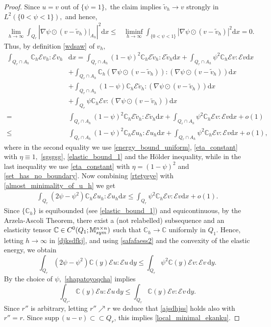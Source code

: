 \documentclass[reqno]{amsart}
\numberwithin{equation}{section}
\theoremstyle{plain}
\theoremstyle{definition}
\newcommand{\C}{\mathbb{C}}
\renewcommand{\d}{\mathrm{d}}
\newcommand{\strictlyincluded}{\subset\subset}
\renewcommand{\tilde}{\widetilde}
\newcommand{\supp}{\mathrm{supp}\,}
\newcommand{\str}[1]{\mathcal{E}#1}
\newcommand{\mtwo}{\mathbb{M}^{n\times n}_{\rm sym}}
\begin{document}
\begin{proof}
%
Since $u=v$ out of $\{\psi=1\},$ the claim implies 
$\tilde v_h\to v$  strongly in $L^2(\{0<\psi<1\}),$ and hence,
%
\begin{align}\label{sgsgsg}
\lim\limits_{h\to\infty} \int_{Q_r} |\nabla \psi\odot (v- \tilde v_h)\big|_{A_h}|^2 \d x \le & 
\liminf\limits_{h\to\infty}  \int_{\{0<\psi <1\}} |\nabla \psi\odot (v- \tilde v_h)|^2 \d x= 0. 
\end{align}
%
Thus, by definition \eqref{wdsaw} of $v_h,$
\begin{align}\label{rtetyeye}
\int_{Q_r\cap A_h}\C_h \str{v_h}:\str{v_h} & \d x =   \int_{Q_r\cap A_h} (1-\psi)^2\C_h \str{\tilde v_h}:\str{\tilde v_h}\d x
+ \int_{Q_r\cap A_h}\psi^2\C_h \str{v}:\str{v}\d x\nonumber \\
& + \int_{Q_r\cap A_h} \C_h (\nabla \psi\odot (v- \tilde v_h)) :( \nabla \psi\odot (v- \tilde v_h))\d x\nonumber \\
& + \int_{Q_r\cap A_h} (1-\psi) \C_h \str{\tilde v_h}:(\nabla \psi\odot (v- \tilde v_h))\d x\nonumber \\
& + 
\int_{Q_r} \psi \C_h\str{v}:
(\nabla \psi\odot (v- \tilde v_h))\d x\nonumber \\
=& \int_{Q_r\cap A_h} (1-\psi)^2\C_h \str{\tilde v_h}:\str{\tilde v_h}\d x
+ \int_{Q_r\cap A_h}\psi^2\C_h \str{v}:\str{v}\d x +
o(1)\nonumber\\
\le & 
\int_{Q_r\cap A_h} (1-\psi)^2\C_h \str{u_h}:\str{u_h}\d x 
+ \int_{Q_r\cap A_h}\psi^2\C_h \str{v}:\str{v}\d x + o(1), 
\end{align}
where in the second equality we use \eqref{energy_bound_uniform}, \eqref{eta_constant} with $\eta\equiv 1,$ \eqref{sgsgsg}, \eqref{elastic_bound_1} and   the H\"older inequality, while in the last inequality we use \eqref{eta_constant} with $\eta=(1-\psi)^2$  and \eqref{set_has_no_boundary}. 
% 
Now  combining \eqref{rtetyeye} with \eqref{almost_minimality_of_u_h}   we get
\begin{align}\label{djksdfkj}
\int_{Q_r}(2\psi -\psi^2)\C_h \str{u_h}:\str{u_h}\d x \le 
\int_{Q_r}\psi^2\C_h \str{v}:\str{v}\d x + o(1). 
\end{align}
%
Since $\{\C_h\}$ is equibounded (see \eqref{elastic_bound_1}) and equicontinuous,  by the Arzela-Ascoli Theorem, there exist  a (not relabelled) subsequence and an elasticity tensor $\C\in C^0(Q_1;\mtwo)$ such that  $\C_h\to \C$ uniformly in $Q_1.$ Hence, 
letting $h\to\infty$ in \eqref{djksdfkj}, and using \eqref{safafaess2} and the convexity of the elastic energy, we obtain
\begin{equation}\label{shapatoyoqcha}
\int_{Q_r}(2\psi -\psi^2) \C(y)\str{u}:\str{u}\,\d y \le 
\int_{Q_r} \psi^2 \C(y)\str{v}:\str{v}\,\d y.
\end{equation}
%
By the choice of $\psi,$ \eqref{shapatoyoqcha} implies 
\begin{equation}\label{ajsdhjss}
\int_{Q_{r''}} \C(y)\str{u}:\str{u}\,\d y \le 
\int_{Q_r} \C(y)\str{v}:\str{v}\,\d y. 
\end{equation}
%
Since $r''$ is arbitrary, letting $r''\nearrow r$ we deduce that \eqref{ajsdhjss} holds also with $r''=r.$   Since $\supp(u-v)\strictlyincluded Q_r$, this implies \eqref{local_minimal_ekanku}. 


\end{proof}
\end{document}
